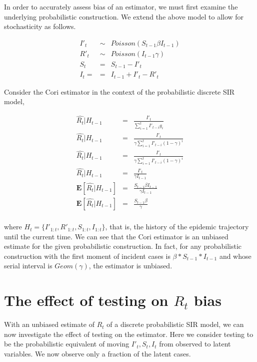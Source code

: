 \documentclass{umassthesis}          %
\begin{document}
In order to accurately assess bias of an estimator, we must first examine the underlying probabilistic construction. We extend the above model to allow for stochasticity as follows. 


\begin{eqnarray}
I'_t &\sim& Poisson(S_{t-1}\beta I_{t-1}) \\
R'_t &\sim& Poisson(I_{t-1} \gamma)\\
S_t &=& S_{t-1} - I'_{t}\\
I_t = &=& I_{t-1} + I'_t - R'_t
\end{eqnarray}

Consider the Cori estimator in the context of the probabilistic discrete SIR model, 

\begin{eqnarray}
\hat{R_t} | H_{t-1} &=& \frac{I'_t}{\sum_{i=1}^t I'_{t-i} g_i}\\
\hat{R_t} | H_{t-1} &=& \frac{I'_t}{\gamma \sum_{i=1}^t I'_{t-i} (1-\gamma)^i}\\
\hat{R_t} | H_{t-1} &=& \frac{I'_t}{\gamma \sum_{i=1}^t I'_{t-i} (1-\gamma)^i}\\
\hat{R_t} | H_{t-1} &=& \frac{I'_t}{\gamma I_{t-1}}\\
\mathbf{E}[\hat{R_t} | H_{t-1}] &=& \frac{S_{t-1}\beta I_{t-1}}{\gamma I_{t-1}}\\
\mathbf{E}[\hat{R_t} | H_{t-1}] &=& \frac{S_{t-1}\beta }{\gamma }\\
\end{eqnarray}

where $H_t = \{I'_{1:t},R'_{1:t},S_{1:t},I_{1:t}\}$, that is, the history of the epidemic trajectory until the current time. We can see that the Cori estimator is an unbiased estimate for the given probabilistic construction. In fact, for any probabilistic construction with the first moment of incident cases is $\beta*S_{t-1}*I_{t-1}$ and whose serial interval is $Geom(\gamma)$, the estimator is unbiased.

\section{ The effect of testing on $R_t$ bias}

With an unbiased estimate of $R_t$ of a discrete probabilistic SIR model, we can now investigate the effect of testing on the estimator. Here we consider testing to be the probabilistic equivalent of moving $I'_t,S_t,I_t$ from observed to latent variables. We now observe only a fraction of the latent cases. 
\end{document}

